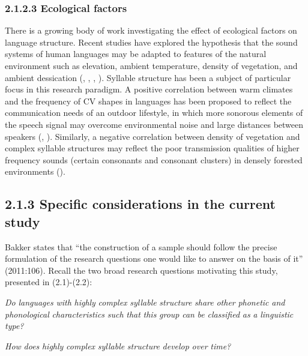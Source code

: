 \subsubsection{\textbf{2.1.2.3} \textbf{Ecological} \textbf{factors}}

  There is a growing body of work investigating the effect of ecological factors on language structure. Recent studies have explored the hypothesis that the sound systems of human languages may be adapted to features of the natural environment such as elevation, ambient temperature, density of vegetation, and ambient dessication (\citealt{Everett2013}, \citealt{MaddiesonCoupé2015}, \citealt{EverettEtAl2016}, \citealt{Everett2017}). Syllable structure has been a subject of particular focus in this research paradigm. A positive correlation between warm climates and the frequency of CV shapes in languages has been proposed to reflect the communication needs of an outdoor lifestyle, in which more sonorous elements of the speech signal may overcome environmental noise and large distances between speakers (\citealt{MunroeEtAl1996}, \citealt{FoughtEtAl2004}). Similarly, a negative correlation between density of vegetation and complex syllable structures may reflect the poor transmission qualities of higher frequency sounds (certain consonants and consonant clusters) in densely forested environments (\citealt{MaddiesonCoupé2015}).


\subsection{2.1.3 Specific considerations in the current study}

  Bakker states that “the construction of a sample should follow the precise formulation of the research questions one would like to answer on the basis of it” (2011:106). Recall the two broad research questions motivating this study, presented in (2.1)-(2.2):



\ea\label{ex:(2.1)}
   \textit{Do} \textit{languages} \textit{with} \textit{highly} \textit{complex} \textit{syllable} \textit{structure} \textit{share} \textit{other} \textit{phonetic} \textit{and} \textit{phonological} \textit{characteristics} \textit{such} \textit{that} \textit{this} \textit{group} \textit{can} \textit{be} \textit{classified} \textit{as} \textit{a} \textit{linguistic} \textit{type?}
\z



\ea\label{ex:(2.2)}
   \textit{How} \textit{does} \textit{highly} \textit{complex} \textit{syllable} \textit{structure} \textit{develop} \textit{over} \textit{time?}
\z



